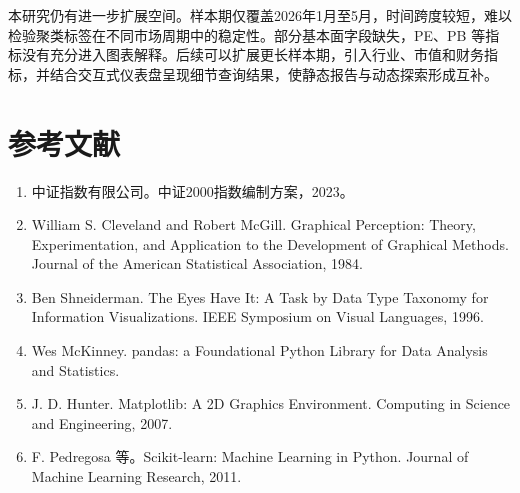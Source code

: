 \documentclass[UTF8,zihao=-4,fontset=windows]{ctexart}
\begin{document}
本研究仍有进一步扩展空间。样本期仅覆盖2026年1月至5月，时间跨度较短，难以检验聚类标签在不同市场周期中的稳定性。部分基本面字段缺失，PE、PB 等指标没有充分进入图表解释。后续可以扩展更长样本期，引入行业、市值和财务指标，并结合交互式仪表盘呈现细节查询结果，使静态报告与动态探索形成互补。

\section*{参考文献}
\begin{enumerate}
  \item 中证指数有限公司。中证2000指数编制方案，2023。
  \item William S. Cleveland and Robert McGill. Graphical Perception: Theory, Experimentation, and Application to the Development of Graphical Methods. Journal of the American Statistical Association, 1984.
  \item Ben Shneiderman. The Eyes Have It: A Task by Data Type Taxonomy for Information Visualizations. IEEE Symposium on Visual Languages, 1996.
  \item Wes McKinney. pandas: a Foundational Python Library for Data Analysis and Statistics.
  \item J. D. Hunter. Matplotlib: A 2D Graphics Environment. Computing in Science and Engineering, 2007.
  \item F. Pedregosa 等。Scikit-learn: Machine Learning in Python. Journal of Machine Learning Research, 2011.
\end{enumerate}
\end{document}
